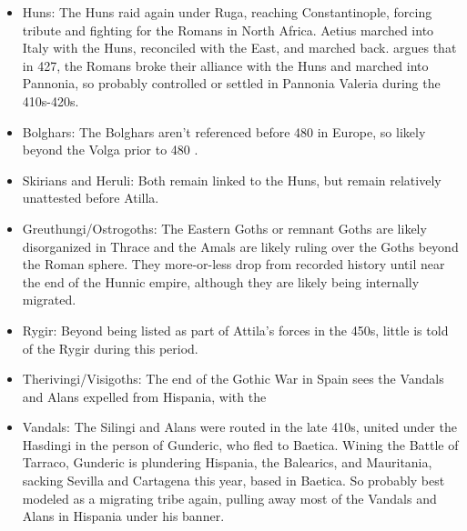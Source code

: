 \documentclass{article}
\begin{document}
	\begin{itemize}
		\item Huns:\newline
		The Huns raid again under Ruga, reaching Constantinople, forcing tribute and fighting for the Romans in North Africa.
		Aetius marched into Italy with the Huns, reconciled with the East, and marched back.
		\cite{OttoHuns} argues that in 427, the Romans broke their alliance with the Huns and marched into Pannonia, so probably controlled or settled in Pannonia Valeria during the 410s-420s.
		
		\item Bolghars:\newline
		The Bolghars aren't referenced before 480 in Europe, so likely beyond the Volga prior to 480 \cite{KimHuns}.
		
		\item Skirians and Heruli:\newline
		Both remain linked to the Huns, but remain relatively unattested before Atilla.
		
		\item Greuthungi/Ostrogoths:\newline
		The Eastern Goths or remnant Goths are likely disorganized in Thrace and the Amals are likely ruling over the Goths beyond the Roman sphere.
		They more-or-less drop from recorded history until near the end of the Hunnic empire, although they are likely being internally migrated.
		
		\item Rygir:\newline
		Beyond being listed as part of Attila's forces in the 450s, little is told of the Rygir during this period.
		
		\item Therivingi/Visigoths:\newline
		The end of the Gothic War in Spain sees the Vandals and Alans expelled from Hispania, with the 
		
		\item Vandals:\newline
		The Silingi and Alans were routed in the late 410s, united under the Hasdingi in the person of Gunderic, who fled to Baetica.
		Wining the Battle of Tarraco, Gunderic is plundering Hispania, the Balearics, and Mauritania, sacking Sevilla and Cartagena this year, based in Baetica.
		So probably best modeled as a migrating tribe again, pulling away most of the Vandals and Alans in Hispania under his banner.
		

\end{itemize}
\end{document}
